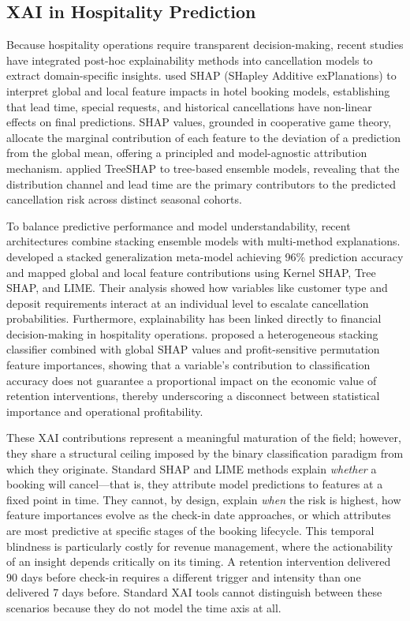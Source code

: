 \documentclass[pdflatex,iicol,sn-mathphys-ay]{sn-jnl}
\theoremstyle{thmstyleone}%
\theoremstyle{thmstyletwo}%
\theoremstyle{thmstylethree}%
\begin{document}
\subsection{XAI in Hospitality Prediction}

Because hospitality operations require transparent decision-making, recent studies have integrated post-hoc explainability methods into cancellation models to extract domain-specific insights. \cite{gomez2025machine} used SHAP (SHapley Additive exPlanations) to interpret global and local feature impacts in hotel booking models, establishing that lead time, special requests, and historical cancellations have non-linear effects on final predictions. SHAP values, grounded in cooperative game theory, allocate the marginal contribution of each feature to the deviation of a prediction from the global mean, offering a principled and model-agnostic attribution mechanism. \cite{herrera2024machine} applied TreeSHAP to tree-based ensemble models, revealing that the distribution channel and lead time are the primary contributors to the predicted cancellation risk across distinct seasonal cohorts.

To balance predictive performance and model understandability, recent architectures combine stacking ensemble models with multi-method explanations. \cite{talal2025hotel} developed a stacked generalization meta-model achieving 96\% prediction accuracy and mapped global and local feature contributions using Kernel SHAP, Tree SHAP, and LIME. Their analysis showed how variables like customer type and deposit requirements interact at an individual level to escalate cancellation probabilities. Furthermore, explainability has been linked directly to financial decision-making in hospitality operations. \cite{liu2025explainable} proposed a heterogeneous stacking classifier combined with global SHAP values and profit-sensitive permutation feature importances, showing that a variable's contribution to classification accuracy does not guarantee a proportional impact on the economic value of retention interventions, thereby underscoring a disconnect between statistical importance and operational profitability.

These XAI contributions represent a meaningful maturation of the field; however, they share a structural ceiling imposed by the binary classification paradigm from which they originate. Standard SHAP and LIME methods explain \textit{whether} a booking will cancel—that is, they attribute model predictions to features at a fixed point in time. They cannot, by design, explain \textit{when} the risk is highest, how feature importances evolve as the check-in date approaches, or which attributes are most predictive at specific stages of the booking lifecycle. This temporal blindness is particularly costly for revenue management, where the actionability of an insight depends critically on its timing. A retention intervention delivered 90 days before check-in requires a different trigger and intensity than one delivered 7 days before. Standard XAI tools cannot distinguish between these scenarios because they do not model the time axis at all.
\end{document}
